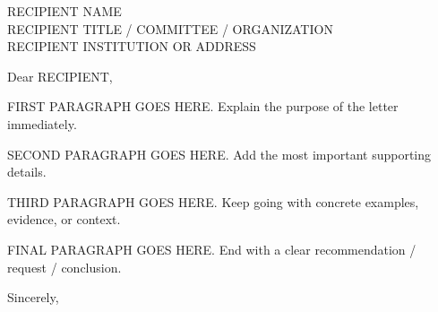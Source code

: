 \documentclass[11pt]{ashletter}
\date{\today}
\begin{document}
\begin{letter}{%
RECIPIENT NAME\\
RECIPIENT TITLE / COMMITTEE / ORGANIZATION\\
RECIPIENT INSTITUTION OR ADDRESS
}

\opening{Dear RECIPIENT,}


FIRST PARAGRAPH GOES HERE. Explain the purpose of the letter immediately.

SECOND PARAGRAPH GOES HERE. Add the most important supporting details.

THIRD PARAGRAPH GOES HERE. Keep going with concrete examples, evidence, or context.

FINAL PARAGRAPH GOES HERE. End with a clear recommendation / request / conclusion.



Sincerely,\\ \\

%
%
%
%
\EndSignatureRow

\end{letter}
\end{document}
